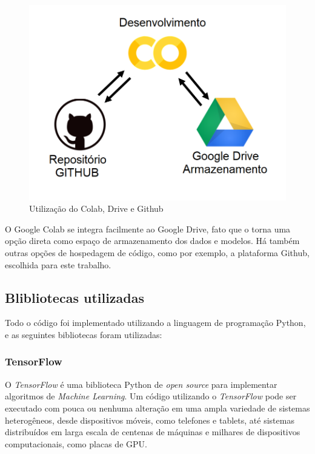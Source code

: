 \begin{figure}[H]
		\centering
		\includegraphics[scale=0.25]{figuras/MachineLearning/colabGithub.png}
		\caption{Utilização do Colab, Drive e Github}
		\label{fig:colabGithub}
\end{figure}

O Google Colab se integra facilmente ao Google Drive, fato que o torna uma opção direta como espaço de armazenamento dos dados e modelos. Há também outras opções de hospedagem de código, como por exemplo, a plataforma Github, escolhida para este trabalho.

\subsection{Blibliotecas utilizadas}

Todo o código foi implementado utilizando a linguagem de programação Python, e as seguintes bibliotecas foram utilizadas:


\subsubsection{TensorFlow}

O \textit{TensorFlow} é uma biblioteca Python de \textit{open source} para implementar algoritmos de \textit{Machine Learning}. Um código utilizando o \textit{TensorFlow} pode ser executado com pouca ou nenhuma alteração em uma ampla variedade de sistemas heterogêneos, desde dispositivos móveis, como telefones e tablets, até sistemas distribuídos em larga escala de centenas de máquinas e milhares de dispositivos computacionais, como placas de GPU.

